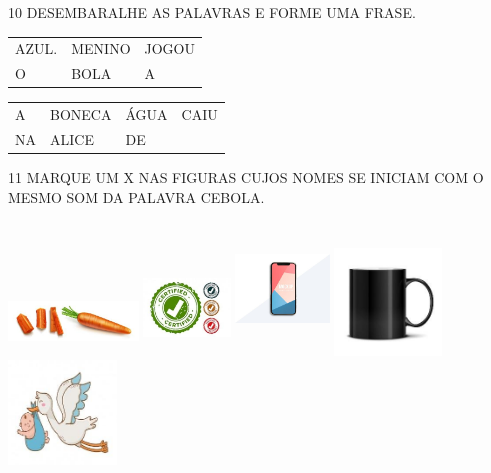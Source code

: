 \num{10} DESEMBARALHE AS PALAVRAS E FORME UMA FRASE.

\begin{longtable}[]{@{}lll@{}}
\toprule
AZUL. & MENINO & JOGOU\tabularnewline
O & BOLA & A\tabularnewline
\bottomrule
\end{longtable}


\begin{longtable}[]{@{}llll@{}}
\toprule
A & BONECA & ÁGUA & CAIU\tabularnewline
NA & ALICE & DE\tabularnewline
\bottomrule
\end{longtable}


\num{11} MARQUE UM X NAS FIGURAS CUJOS NOMES SE INICIAM COM O MESMO SOM DA PALAVRA CEBOLA.


\includegraphics[width=1.36272in,height=0.72875in]{media/image105.jpg}
\includegraphics[width=0.90977in,height=1.00720in]{media/image106.jpg}
\includegraphics[width=0.98256in,height=1.40209in]{media/image107.jpg}
\includegraphics[width=1.12500in,height=1.12500in]{media/image108.jpg}
\includegraphics[width=1.13713in,height=1.09392in]{media/image109.jpg}


